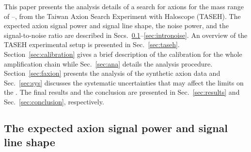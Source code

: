 This paper presents the analysis 
details of a search for axions for the mass range of \mlo--\mhi\muevcc, 
from the Taiwan Axion Search Experiment with Haloscope (TASEH). 
The expected axion signal power and signal line shape, the noise power, 
and the signal-to-noise ratio are described in 
Secs.~\ref{sec:introsignal}--\ref{sec:intronoise}. An overview 
of the TASEH experimental setup is presented in Sec.~\ref{sec:taseh}. 
Section~\ref{sec:calibration} gives a brief 
description of the calibration for the whole amplification chain 
while Sec.~\ref{sec:ana} details the analysis procedure.  
Section~\ref{sec:faxion} presents the analysis of the 
synthetic axion 
data and Sec.~\ref{sec:sys} discusses the systematic 
uncertainties that may affect the limits on the \gagg. 
The final results and the conclusion are presented in 
Sec.~\ref{sec:results} and Sec.~\ref{sec:conclusion}, 
respectively. 


\subsection{The expected axion signal power and signal line shape}
\label{sec:introsignal}

